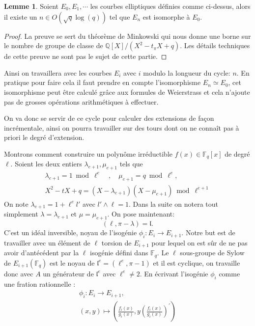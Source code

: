 \documentclass[10pt,a4paper]{book}
\theoremstyle{plain}
\theoremstyle{definition}
\newtheorem{lem}[thm]{Lemme}
\theoremstyle{definition}
\theoremstyle{definition}
\theoremstyle{definition}
\theoremstyle{remark}
\theoremstyle{remark}
\begin{document}
\begin{lem}
Soient $E_0,E_1, \cdots$ les courbes elliptiques définies comme ci-dessus, alors il existe un $n \in O(\sqrt{q}\log(q))$ tel que $E_n$ est isomorphe à $E_0$.
\end{lem}

\begin{proof}
La preuve se sert du théorème de Minkowski qui nous donne une borne sur le nombre de groupe de classe de $\mathbb{Q}[X]/(X^2-t_{\pi}X+q)$. Les détails techniques de cette preuve ne sont pas le sujet de cette partie.
\end{proof}

Ainsi on travaillera avec les courbes $E_i$ avec $i$ modulo la longueur du cycle: $n$. En pratique pour faire cela il faut prendre en compte l'isomorphisme $E_n \simeq E_0$, cet isomorphisme peut être calculé grâce aux formules de Weierstrass et cela n'ajoute pas de grosses opérations arithmétiques à effectuer.

On va donc se servir de ce cycle pour calculer des extensions de façon incrémentale, ainsi on pourra travailler sur des tours dont on ne connaît pas à priori le degré d'extension. 

Montrons comment construire un polynôme irréductible $f(x) \in \mathbb{F}_q[x]$ de degré $\ell$. Soient  les deux entiers $\lambda_{e+1}, \mu_{e+1}$ tels que 
\begin{align*}
\lambda_{e+1}=1 \bmod \ell^{e} \quad , \quad \mu_{e+1}=q \bmod \ell^e, \\
X^2-tX+q = (X-\lambda_{e+1})(X-\mu_{e+1}) \bmod \ell^{e+1} 
\end{align*}
On note $\lambda_{e+1}=1+\ell^el'$ avec $l' \wedge \ell = 1$. Dans la suite on notera tout simplement $\lambda=\lambda_{e+1}$ et $\mu = \mu_{e+1}$. On pose maintenant:
\begin{equation*}
(\ell,\pi-\lambda)=\mathfrak{l}.
\end{equation*}
C'est un idéal inversible, noyau de l'isogénie $\phi_{i}:E_i \to E_{i+1}$. Notre but est de travailler avec un élément de $\ell$ torsion de $E_{i+1}$ pour lequel on est sûr de ne pas avoir d'antécédent par la $\ell$ isogénie défini dans $\mathbb{F}_q$. Le $\ell$ sous-groupe de Sylow de $E_{i+1}(\mathbb{F}_q)$ est le noyau de $\mathfrak{l}^e=(\ell^e,\pi - 1)$ et il est cyclique, on travaille donc avec $A$ un générateur de $\mathfrak{l}^e$ avec $\ell^e \neq 2$. En écrivant l'isogénie $\phi_i$ comme une fration rationnelle : 
\begin{align*}
\phi_{i}:E_i \to E_{i+1}, \\
(x,y) \mapsto \left( \frac{f_{i}(x)}{g_{i}(x)} ,y \left( \frac{f_{i}(x)}{g_{i}(x)} \right) ^{'} \right)
\end{align*}
\end{document}
